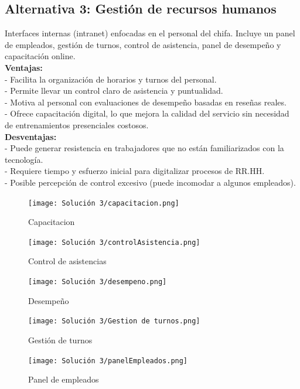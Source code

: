 \documentclass{article}
\begin{document}
\begin{doublespace}
    \subsection{Alternativa 3: Gestión de recursos humanos}

    \noindent Interfaces internas (intranet) enfocadas en el personal del chifa. Incluye un panel de empleados, gestión de turnos, control de asistencia, panel de desempeño y capacitación online.\\
    \textbf{Ventajas:}\\
    - Facilita la organización de horarios y turnos del personal.\\
    - Permite llevar un control claro de asistencia y puntualidad.\\
    - Motiva al personal con evaluaciones de desempeño basadas en reseñas reales.\\
    - Ofrece capacitación digital, lo que mejora la calidad del servicio sin necesidad de entrenamientos presenciales costosos.
    \\
    \textbf{Desventajas:}\\
    - Puede generar resistencia en trabajadores que no están familiarizados con la tecnología.\\
    - Requiere tiempo y esfuerzo inicial para digitalizar procesos de RR.HH.\\
    - Posible percepción de control excesivo (puede incomodar a algunos empleados).\\

    \begin{figure}[H]
        \centering
        \vspace*{1cm}
        \texttt{[image: Solución 3/capacitacion.png]}
        \caption{Capacitacion}
        \label{fig:Capacitacion}
    \end{figure}
    \begin{figure}[H]
        \centering
        \vspace*{1cm}
        \texttt{[image: Solución 3/controlAsistencia.png]}
        \caption{Control de asistencias}
        \label{fig:Control-de-asistencias}
    \end{figure}
    \begin{figure}[H]
        \centering
        \vspace*{1cm}
        \texttt{[image: Solución 3/desempeno.png]}
        \caption{Desempeño}
        \label{fig:Desempeno}
    \end{figure}
    \begin{figure}[H]
        \centering
        \vspace*{1cm}
        \texttt{[image: Solución 3/Gestion de turnos.png]}
        \caption{Gestión de turnos}
        \label{fig:Gestion-de-turnos}
    \end{figure}
    \begin{figure}[H]
        \centering
        \vspace*{1cm}
        \texttt{[image: Solución 3/panelEmpleados.png]}
        \caption{Panel de empleados}
        \label{fig:Panel-de-empleados}
    \end{figure}


\end{doublespace}
\end{document}
